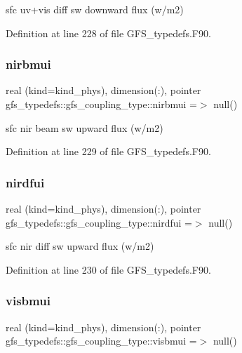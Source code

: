 sfc uv+vis diff sw downward flux (w/m2) 



Definition at line 228 of file G\+F\+S\+\_\+typedefs.\+F90.

\mbox{\label{structgfs__typedefs_1_1gfs__coupling__type_a4e04c27a76c71c162b14292c74322c70}} 
\subsubsection{nirbmui}
{\footnotesize\ttfamily real (kind=kind\+\_\+phys), dimension(\+:), pointer gfs\+\_\+typedefs\+::gfs\+\_\+coupling\+\_\+type\+::nirbmui =$>$ null()}



sfc nir beam sw upward flux (w/m2) 



Definition at line 229 of file G\+F\+S\+\_\+typedefs.\+F90.

\mbox{\label{structgfs__typedefs_1_1gfs__coupling__type_aefbeb5116a9dec3fc167e46538062b60}} 
\subsubsection{nirdfui}
{\footnotesize\ttfamily real (kind=kind\+\_\+phys), dimension(\+:), pointer gfs\+\_\+typedefs\+::gfs\+\_\+coupling\+\_\+type\+::nirdfui =$>$ null()}



sfc nir diff sw upward flux (w/m2) 



Definition at line 230 of file G\+F\+S\+\_\+typedefs.\+F90.

\mbox{\label{structgfs__typedefs_1_1gfs__coupling__type_a8b6cd2f23b0ec242f441fe200736d99d}} 
\subsubsection{visbmui}
{\footnotesize\ttfamily real (kind=kind\+\_\+phys), dimension(\+:), pointer gfs\+\_\+typedefs\+::gfs\+\_\+coupling\+\_\+type\+::visbmui =$>$ null()}



